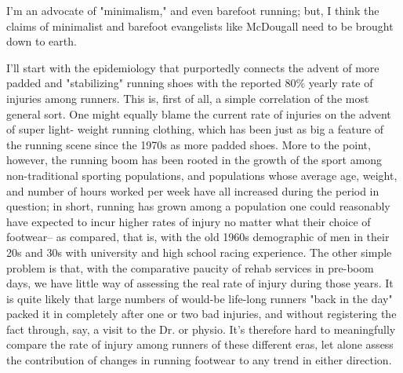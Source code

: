 I'm an advocate of "minimalism," and even barefoot running; but, I think the claims of minimalist and barefoot evangelists like McDougall need to be brought down to earth.

I'll start with the epidemiology that purportedly connects the advent of more padded and "stabilizing" running shoes with the reported 80\% yearly rate of injuries among runners. This is, first of all, a simple correlation of the most general sort. One might equally blame the current rate of injuries on the advent of super light- weight running clothing, which has been just as big a feature of the running scene since the 1970s as more padded shoes. More to the point, however, the running boom has been rooted in the growth of the sport among non-traditional sporting populations, and populations whose average age, weight, and number of hours worked per week have all increased during the period in question; in short, running has grown among a population one could reasonably have expected to incur higher rates of injury no matter what their choice of footwear-- as compared, that is, with the old 1960s demographic of men in their 20s and 30s with university and high school racing experience. The other simple problem is that, with the comparative paucity of rehab services in pre-boom days, we have little way of assessing the real rate of injury during those years. It is quite likely that large numbers of would-be life-long runners "back in the day" packed it in completely after one or two bad injuries, and without registering the fact through, say, a visit to the Dr. or physio. It's therefore hard to meaningfully compare the rate of injury among runners of these different eras, let alone assess the contribution of changes in running footwear to any trend in either direction.

